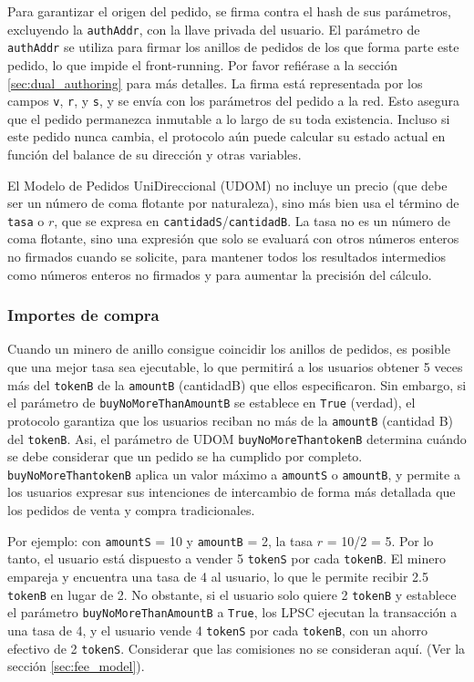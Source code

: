 \documentclass[UTF8,nofonts]{article}
\begin{document}
\begin{multicols}{2}
Para garantizar el origen del pedido, se firma contra el hash de sus par\'ametros, excluyendo la \verb|authAddr|, con la llave privada del usuario. El par\'ametro de \verb|authAddr| se utiliza para firmar los anillos de pedidos de los que forma parte este pedido, lo que impide el front-running. Por favor refi\'erase a la secci\'on \ref{sec:dual_authoring} para m\'as detalles. La firma est\'a representada por los campos \verb|v|, \verb|r|, y \verb|s|, y se env\'ia con los par\'ametros del pedido a la red. Esto asegura que el pedido permanezca inmutable a lo largo de su toda existencia. Incluso si este pedido nunca cambia, el protocolo a\'un puede calcular su estado actual en funci\'on del balance de su direcci\'on y otras variables.


El Modelo de Pedidos UniDireccional (UDOM) no incluye un precio (que debe ser un n\'umero de coma flotante por naturaleza), sino m\'as bien usa el t\'ermino de \verb|tasa| o $r$, que se expresa en \verb|cantidadS|/\verb|cantidadB|. La tasa no es un n\'umero de coma flotante, sino una expresi\'on que solo se evaluar\'a con otros n\'umeros enteros no firmados cuando se solicite, para mantener todos los resultados intermedios como n\'umeros enteros no firmados y para aumentar la precisi\'on del c\'alculo.


\subsubsection{Importes de compra}
Cuando un minero de anillo consigue coincidir los anillos de pedidos, es posible que una mejor tasa sea ejecutable, lo que permitir\'a a los usuarios obtener 5 veces m\'as del \verb|tokenB| de la \verb|amountB| (cantidadB) que ellos especificaron. Sin embargo, si el par\'ametro de \verb|buyNoMoreThanAmountB| se establece en \verb|True| (verdad), el protocolo garantiza que los usuarios reciban no m\'as de la \verb|amountB| (cantidad B) del \verb|tokenB|. Asi, el par\'ametro de UDOM \verb|buyNoMoreThantokenB| determina cu\'ando se debe considerar que un pedido se ha cumplido por completo. \verb|buyNoMoreThantokenB| aplica un valor m\'aximo a \verb|amountS| o \verb|amountB|, y permite a los usuarios expresar sus intenciones de intercambio de forma m\'as detallada que los pedidos de venta y compra tradicionales.

Por ejemplo: con \verb|amountS| = 10 y \verb|amountB| = 2, la tasa $r$ = 10/2 = 5. Por lo tanto, el usuario est\'a dispuesto a vender 5  \verb|tokenS| por cada \verb|tokenB|. El minero empareja y encuentra una tasa de 4 al usuario, lo que le permite recibir 2.5 \verb|tokenB| en lugar de 2. No obstante, si el usuario solo quiere 2 \verb|tokenB| y establece el par\'ametro \verb|buyNoMoreThanAmountB| a \verb|True|, los LPSC ejecutan la transacci\'on a una tasa de 4, y el usuario vende 4 \verb|tokenS| por cada \verb|tokenB|, con un ahorro efectivo de 2 \verb|tokenS|. Considerar que las comisiones no se consideran aqu\'i.  (Ver la secci\'on \ref{sec:fee_model}).


\end{multicols}
\end{document}
